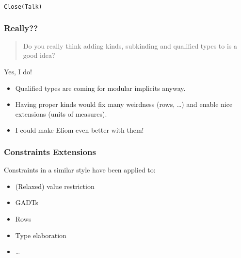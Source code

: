 \documentclass[xcolor=svgnames,11pt]{beamer}
\begin{document}
\begin{frame}
  \Huge{\texttt{Close(Talk)}}
\end{frame}

\begin{frame}
  \frametitle{Really??}

  \begin{quote}
    Do you really think adding kinds, subkinding and qualified types to \ocaml is a good idea?
  \end{quote}\pause
  Yes, I do!\pause
  \begin{itemize}
  \item Qualified types are coming for modular implicits anyway.
  \item Having proper kinds would fix many weirdness (rows, \dots) and
    enable nice extensions (units of measures).\pause
  \item I could make Eliom even better with them! \smiley{}
  \end{itemize}
\end{frame}







\begin{frame}
  \frametitle{Constraints \hfill Extensions}
  Constraints in a similar style have been applied to:
  \begin{itemize}
  \item (Relaxed) value restriction
  \item GADTs
  \item Rows
  \item Type elaboration
  \item \dots
  \end{itemize}
\end{frame}
\end{document}
